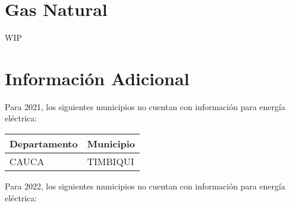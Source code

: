 \documentclass[12pt,a4paper]{article}
\begin{document}
\section{Gas Natural}

WIP


\section*{Información Adicional}

Para 2021, los siguientes municipios no cuentan con información para energía eléctrica:

\begin{table}[h!]
	\centering
	\begin{tabular}{@{}ll@{}}
		\toprule
		\textbf{Departamento} & \textbf{Municipio} \\ \midrule
		CAUCA                 & TIMBIQUI           \\ \bottomrule
	\end{tabular}
\end{table}

Para 2022, los siguientes municipios no cuentan con información para energía eléctrica:
\end{document}
